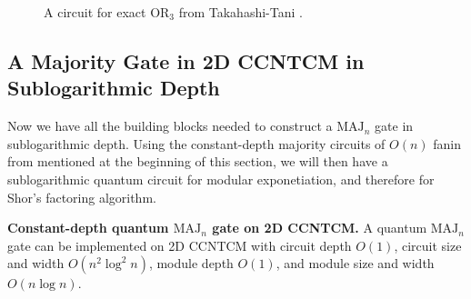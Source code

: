\begin{figure}[hbt!]
\caption{A circuit for exact $\text{OR}_3$ from Takahashi-Tani \cite{Takahashi2011}.}
\label{fig:exact-or}
\end{figure}

\subsection{A Majority Gate in \textsf{2D CCNTCM} in Sublogarithmic Depth}
\label{subsec:maj-gate}

Now we have all the building blocks needed to construct a
$\text{MAJ}_n$ gate in sublogarithmic depth. Using the constant-depth
majority circuits of $O(n)$ fanin from \cite{Yeh1996} mentioned at
the beginning of this section, we will then have a sublogarithmic
quantum circuit for modular exponetiation, and therefore for
Shor's factoring algorithm.

\begin{theorem}{\textbf{Constant-depth quantum $\text{MAJ}_n$ gate on \textsf{2D CCNTCM}.}}
A quantum $\text{MAJ}_n$ gate can be implemented on \textsf{2D CCNTCM} with
circuit depth $O(1)$, circuit size and width $O(n^2\log^2 n)$,
module depth $O(1)$, and module size and width $O(n \log n)$.
\label{thm:maj-gate}
\end{theorem}

